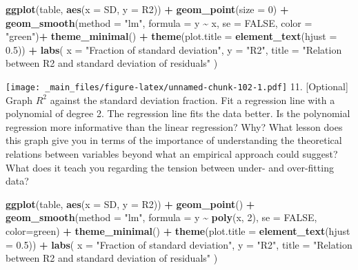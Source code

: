 \documentclass[
]{book}
\newenvironment{Shaded}{\begin{snugshade}}{\end{snugshade}}
\newcommand{\AttributeTok}[1]{\textcolor[rgb]{0.13,0.29,0.53}{#1}}
\newcommand{\ConstantTok}[1]{\textcolor[rgb]{0.56,0.35,0.01}{#1}}
\newcommand{\DecValTok}[1]{\textcolor[rgb]{0.00,0.00,0.81}{#1}}
\newcommand{\FloatTok}[1]{\textcolor[rgb]{0.00,0.00,0.81}{#1}}
\newcommand{\FunctionTok}[1]{\textcolor[rgb]{0.13,0.29,0.53}{\textbf{#1}}}
\newcommand{\NormalTok}[1]{#1}
\newcommand{\SpecialCharTok}[1]{\textcolor[rgb]{0.81,0.36,0.00}{\textbf{#1}}}
\newcommand{\StringTok}[1]{\textcolor[rgb]{0.31,0.60,0.02}{#1}}
\begin{document}
\begin{Shaded}
\begin{Highlighting}[]
\FunctionTok{ggplot}\NormalTok{(table, }\FunctionTok{aes}\NormalTok{(}\AttributeTok{x =}\NormalTok{ SD, }\AttributeTok{y =}\NormalTok{ R2)) }\SpecialCharTok{+}
  \FunctionTok{geom\_point}\NormalTok{(}\AttributeTok{size =} \DecValTok{0}\NormalTok{) }\SpecialCharTok{+}
  \FunctionTok{geom\_smooth}\NormalTok{(}\AttributeTok{method =} \StringTok{"lm"}\NormalTok{, }\AttributeTok{formula =}\NormalTok{ y }\SpecialCharTok{\textasciitilde{}}\NormalTok{ x, }\AttributeTok{se =} \ConstantTok{FALSE}\NormalTok{, }\AttributeTok{color =} \StringTok{"green"}\NormalTok{)}\SpecialCharTok{+}
  \FunctionTok{theme\_minimal}\NormalTok{() }\SpecialCharTok{+}
  \FunctionTok{theme}\NormalTok{(}\AttributeTok{plot.title =} \FunctionTok{element\_text}\NormalTok{(}\AttributeTok{hjust =} \FloatTok{0.5}\NormalTok{)) }\SpecialCharTok{+}
  \FunctionTok{labs}\NormalTok{(}
    \AttributeTok{x =} \StringTok{"Fraction of standard deviation"}\NormalTok{,}
    \AttributeTok{y =} \StringTok{"R2"}\NormalTok{,}
    \AttributeTok{title =} \StringTok{"Relation between R2 and standard deviation of residuals"}
\NormalTok{  ) }
\end{Highlighting}
\end{Shaded}

\texttt{[image: \_main\_files/figure-latex/unnamed-chunk-102-1.pdf]}
11. {[}Optional{]} Graph \(R^2\) against the standard deviation fraction. Fit a regression line with a polynomial of degree 2. The regression line fits the data better. Is the polynomial regression more informative than the linear regression? Why? What lesson does this graph give you in terms of the importance of understanding the theoretical relations between variables beyond what an empirical approach could suggest? What does it teach you regarding the tension between under- and over-fitting data?

\begin{Shaded}
\begin{Highlighting}[]
\FunctionTok{ggplot}\NormalTok{(table, }\FunctionTok{aes}\NormalTok{(}\AttributeTok{x =}\NormalTok{ SD, }\AttributeTok{y =}\NormalTok{ R2)) }\SpecialCharTok{+}
  \FunctionTok{geom\_point}\NormalTok{() }\SpecialCharTok{+}
  \FunctionTok{geom\_smooth}\NormalTok{(}\AttributeTok{method =} \StringTok{"lm"}\NormalTok{, }\AttributeTok{formula =}\NormalTok{ y }\SpecialCharTok{\textasciitilde{}} \FunctionTok{poly}\NormalTok{(x, }\DecValTok{2}\NormalTok{), }\AttributeTok{se =} \ConstantTok{FALSE}\NormalTok{, }\AttributeTok{color=}\StringTok{\textquotesingle{}green\textquotesingle{}}\NormalTok{) }\SpecialCharTok{+}
  \FunctionTok{theme\_minimal}\NormalTok{() }\SpecialCharTok{+}
  \FunctionTok{theme}\NormalTok{(}\AttributeTok{plot.title =} \FunctionTok{element\_text}\NormalTok{(}\AttributeTok{hjust =} \FloatTok{0.5}\NormalTok{)) }\SpecialCharTok{+}
  \FunctionTok{labs}\NormalTok{(}
    \AttributeTok{x =} \StringTok{"Fraction of standard deviation"}\NormalTok{,}
    \AttributeTok{y =} \StringTok{"R2"}\NormalTok{,}
    \AttributeTok{title =} \StringTok{"Relation between R2 and standard deviation of residuals"}
\NormalTok{  ) }
\end{Highlighting}
\end{Shaded}
\end{document}
